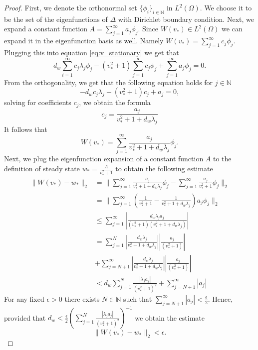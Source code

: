 \documentclass[11pt, a4paper]{article}
\theoremstyle{break}
\theoremstyle{break}
\theoremstyle{break}
\theoremstyle{break}
\theoremstyle{break}
\theoremstyle{break}
\theoremstyle{break}
\begin{document}
\begin{proof}
    First, we denote the orthonormal set $\{\phi_i\}_{i \in \mathbb{N}}$ in $L^2(\Omega)$. We choose it to be the set of the eigenfunctions of $\Delta$ with Dirichlet boundary condition. Next, 
    we expand a constant function $A = \sum_{j=1}^\infty a_j \phi_j$. Since $W(v_*) \in L^2(\Omega)$ we can expand it in the eigenfunction basis as well. Namely $W(v_*) = \sum_{j=1}^\infty c_j \phi_j$. Plugging this into equation \eqref{eq:v_stationary} we get that
    \begin{equation*}
        d_w\sum_{i=1}^\infty c_j \lambda_j \phi_j - (v_*^2 + 1) \sum_{j=1}^\infty c_j \phi_j + \sum_{j=1}^\infty a_j \phi_j = 0.
    \end{equation*}
    From the orthogonality, we get that the following equation holds for $j \in \mathbb{N}$
    \begin{equation*}
        -d_w c_j\lambda_j - (v_*^2+1) c_j + a_j = 0,
    \end{equation*}
    solving for coefficients $c_j$, we obtain the formula
    \begin{equation*}
        c_j = \frac{a_j}{v_*^2 + 1 + d_w\lambda_j}
    \end{equation*}
    It follows that
    \begin{equation*}
        W(v_*) = \sum_{j=1}^\infty \frac{a_j}{v_*^2 + 1 + d_w\lambda_j} \phi_j.
    \end{equation*}
    Next, we plug the eigenfunction expansion of a constant function $A$ to the definition of steady state $w_* = \frac{A}{v_*^2 + 1}$ to obtain the following estimate
    \begin{align*}
        \|W(v_*) - w_*\|_2 
        &=
        \|\sum_{j=1}^\infty \frac{a_j}{v_*^2 + 1 + d_w\lambda_j} \phi_j - \sum_{j=1}^\infty \frac{a_j}{v_*^2 + 1}\phi_j\|_2  \\
        &=
        \|\sum_{j=1}^\infty\left(\frac{1}{v_*^2+1} - \frac{1}{v_*^2+1 + d_w\lambda_j} \right) a_j\phi_j\|_2  \\
        &\leq
        \sum_{j=1}^\infty\left| \frac{d_w \lambda_j a_j}{(v_*^2+1)(v_*^2+1 + d_w\lambda_j)} \right| \\
        &=
        \sum_{j=1}^N \left| \frac{d_w \lambda_j}{v_*^2 + 1 + d_w\lambda_j} \right| \left| \frac{a_j}{(v_*^2+1)} \right|  \\
        &+
        \sum_{j=N+1}^\infty\left| \frac{d_w \lambda_j}{v_*^2 + 1 + d_w\lambda_j} \right| \left| \frac{a_j}{(v_*^2+1)} \right| \\
        &<
        d_w \sum_{j=1}^N \frac{|\lambda_j a_j|}{(v_*^2 + 1)^2}
        + \sum_{j=N+1}^\infty |a_j|
    \end{align*}
    For any fixed $\epsilon > 0$ there exists $N \in \mathbb{N}$ such that $\sum_{j=N+1}^\infty |a_j| < \frac{\epsilon}{2}$. Hence, provided that $d_w < \frac{\epsilon}{2} \left(\sum_{j=1}^N \frac{|\lambda_j a_j|}{(v_*^2 + 1)^2}\right)^{-1}$ we obtain the estimate
    \begin{equation}
        \|W(v_*) - w_* \|_2 < \epsilon.
    \end{equation}
\end{proof}
\end{document}
